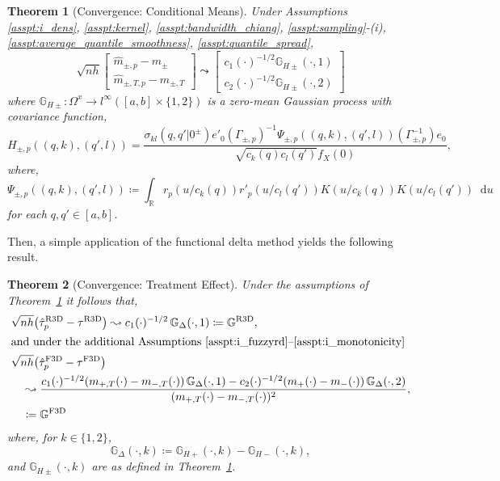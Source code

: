 \documentclass[12pt]{article}
\newcommand*\dd{\mathop{}\!\mathrm{d}}
\newtheorem{theorem}{Theorem}
\begin{document}
\begin{theorem}[Convergence: Conditional Means] \label{thm:asymptotic_conditional_means}
    Under Assumptions \ref{asspt:i_dens}, \ref{asspt:kernel}, \ref{asspt:bandwidth_chiang}, \ref{asspt:sampling}-(i), \ref{asspt:average_quantile_smoothness}, \ref{asspt:quantile_spread},
    $$
    \sqrt{nh} \left[
    \begin{array}{c} \hat{m}_{\pm,p} - m_\pm  \\  \hat{m}_{\pm, T,p} - m_{\pm, T} \end{array}\right] 
    \leadsto 
     \left[
    \begin{array}{c} 
    c_1(\cdot)^{-1/2} \mathbb{G}_{H\pm}(\cdot,1) \\ 
     c_2(\cdot)^{-1/2} \mathbb{G}_{H\pm}(\cdot,2)
    \end{array}\right] 
    $$
    where $\mathbb{G}_{H \pm} : \Omega^x \to l^{\infty}\left( [a,b] \times \{ 1,2\}\right)$ is a zero-mean Gaussian process with covariance function,
\[
H_{\pm, p}\left((q, k), (q',l)\right) = \frac{
\sigma_{kl}( q, q' | 0^{\pm}) e'_0 \left(\Gamma_{\pm,p}\right)^{-1} \Psi_{\pm,p}\left((q,k),(q',l)\right) \left( \Gamma_{\pm,p}^{-1} \right) e_0
}{
\sqrt{ c_k(q) c_l(q')  } f_{X}(0)
},
\]
where,
\[
\Psi_{\pm,p}\left((q,k),(q',l)\right) \coloneqq \int_{\mathbb{R}} r_p(u  /c_k(q)) r'_p( u / c_l(q')) K(u / c_k(q )) K(u / c_l(q')) \dd u
\]
for each $q, q' \in [a,b]$. 
\end{theorem}

Then, a simple application of the functional delta method yields the following result. 

\begin{theorem}[Convergence: Treatment Effect] 
\label{thm:asymptotic_treatment_effects}
Under the assumptions of Theorem~\ref{thm:asymptotic_conditional_means} it follows that, 
\begin{align*}
& \sqrt{n h}\bigl(\hat{\tau}_p^{\mathrm{R3D}} - \tau^{\mathrm{R3D}}\bigr)
  \leadsto c_1(\cdot)^{-1/2}\,\mathbb{G}_\Delta(\cdot, 1) \coloneqq \mathbb{G}^{\mathrm{R3D}},  \\
\intertext{and under the additional Assumptions \ref{asspt:i_fuzzyrd}--\ref{asspt:i_monotonicity}}
& \sqrt{n h}\bigl(\hat{\tau}_p^{\mathrm{F3D}} - \tau^{\mathrm{F3D}}\bigr)  \\ 
  & \quad \leadsto  \frac{
    c_1(\cdot)^{-1/2}(m_{+,T}(\cdot)-m_{-,T}  (\cdot))\,\mathbb{G}_\Delta(\cdot,1)
    - c_2(\cdot)^{-1/2}(m_{+}(\cdot)-m_{-}(\cdot))\,\mathbb{G}_\Delta(\cdot,2)
  }{(m_{+,T}(\cdot)-m_{-,T}(\cdot))^2},    \\
  & \quad \coloneqq \mathbb{G}^{\mathrm{F3D}} 
\end{align*}
\noindent where, for $k \in \{1,2\}$,
\[
\mathbb{G}_\Delta(\cdot, k) \coloneqq \mathbb{G}_{H+}(\cdot, k) -  \mathbb{G}_{H-}(\cdot, k),
\]
and $\mathbb{G}_{H\pm}(\cdot,k)$ are as defined in Theorem~\ref{thm:asymptotic_conditional_means}.
\end{theorem}
\end{document}
